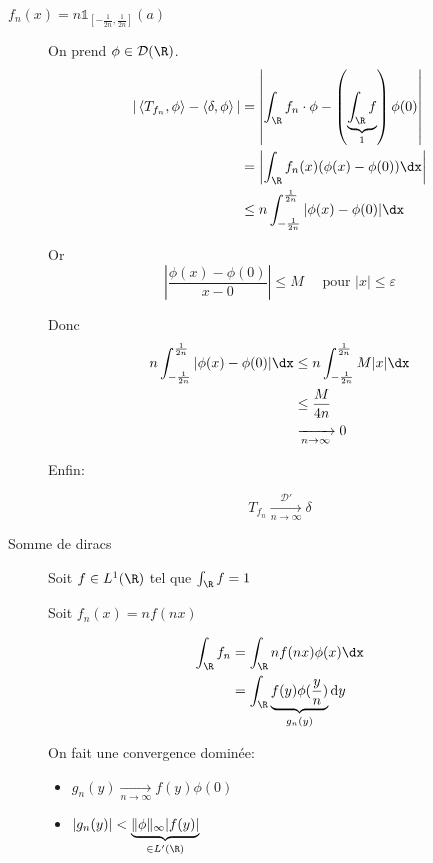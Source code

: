 	\begin{description}
		\item[$f_n(x) = n \mathbb{1}_{[-\frac{1}{2n}, \frac{1}{2n}]}(a)$] 

			On prend $\phi\in \mathcal{D}(\R)$.
		\begin{align*}
			|\left<T_{f_n}, \phi \right> - \left<\delta, \phi \right>| &= \left|\int_\R f_n  \cdot \phi - \left( \underbrace{\int_\R f}_{1} \right) \phi(0)\right| \\
			&= \left|\int_\R f_n(x) (\phi(x) - \phi(0)) \dx \right|\\
			&\le n \int_{-\frac{1}{2n}}^{\frac{1}{2n}} | \phi(x) - \phi(0)| \dx\\
		\end{align*}

		Or \[
			\left| \frac{\phi(x) - \phi(0)}{x-0} \right| \le  M \quad \text{ pour } |x| \le \varepsilon
		\] 

		Donc \begin{align*}
			n \int_{-\frac{1}{2n}}^{\frac{1}{2n}} | \phi(x) - \phi(0)| \dx &\le n \int_{-\frac{1}{2n}}^{\frac{1}{2n}} M|x| \dx \\
										       &\le \frac{M}{4n} \\
										       &\xrightarrow[n\to \infty]{} 0
		\end{align*}

		Enfin:

		\[
			T_{f_n} \xrightarrow[n \to \infty]{\mathcal{D}'} \delta

			
		\] 

		\item[Somme de diracs] 
			Soit $f\in L^1(\R)$ tel que $\int_\R f = 1$

			Soit $f_n(x) = nf(nx)$ 

			\begin{align*}
				\int_\R f_n &= \int_{\R} nf(nx) \phi(x) \dx \\
					    &= \int_\R \underbrace{f(y) \phi(\frac{y}{n})}_{g_n(y)} \mathrm{d}y \\
			\end{align*}

			On fait une convergence dominée:

			\begin{itemize}
				\item $g_n(y) \xrightarrow[n\to \infty]{} f(y) \phi(0)$ 
				\item $|g_n(y)| < \underbrace{\|\phi\|_{\infty} |f(y)|}_{\in L'(\R)}$ 
			\end{itemize}


\end{description}
